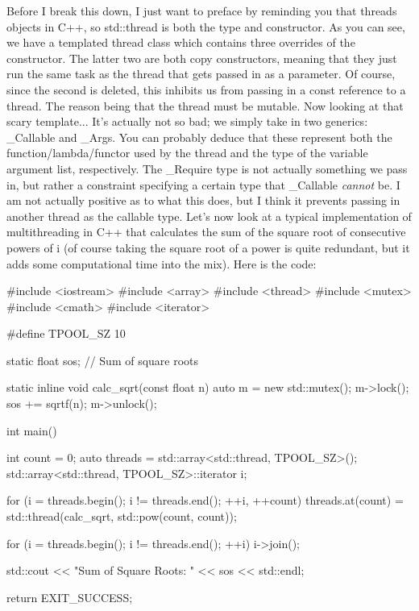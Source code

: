 \documentclass{article}
\begin{document}
Before I break this down, I just want to preface by reminding you that threads objects in C++, so
std::thread is both the type and constructor. As you can see, we have a templated thread class which contains
three overrides of the constructor. The latter two are both copy constructors, meaning that they just run the
same task as the thread that gets passed in as a parameter. Of course, since the second is deleted, this
inhibits us from passing in a const reference to a thread. The reason being that the thread must be mutable.
Now looking at that scary template... It’s actually not so bad; we simply take in two generics: \_Callable
and \_Args. You can probably deduce that these represent both the function/lambda/functor used by the thread
and the type of the variable argument list, respectively. The \_Require type is not actually something we pass
in, but rather a constraint specifying a certain type that \_Callable \textit{cannot} be. I am not actually
positive as to what this does, but I think it prevents passing in another thread as the callable type. Let's
now look at a typical implementation of multithreading in C++ that calculates the sum of the square root of
consecutive powers of i (of course taking the square root of a power is quite redundant, but it adds some
computational time into the mix). Here is the code:

\begin{cpplst}
#include <iostream>
#include <array>
#include <thread>
#include <mutex>
#include <cmath>
#include <iterator>

#define TPOOL_SZ 10

static float sos; // Sum of square roots

static inline void calc_sqrt(const float n)
{
    auto m = new std::mutex();
    m->lock();
    sos += sqrtf(n);
    m->unlock();
}

int main()
{
    int count = 0;
    auto threads = std::array<std::thread, TPOOL_SZ>();
    std::array<std::thread, TPOOL_SZ>::iterator i;

    for (i = threads.begin(); i != threads.end(); ++i, ++count)
    {
        threads.at(count) = std::thread(calc_sqrt, std::pow(count, count));
    }

    for (i = threads.begin(); i != threads.end(); ++i)
    {
        i->join();
    }

    std::cout << "Sum of Square Roots: " << sos << std::endl;

   return EXIT_SUCCESS;
}
\end{cpplst}
\end{document}
